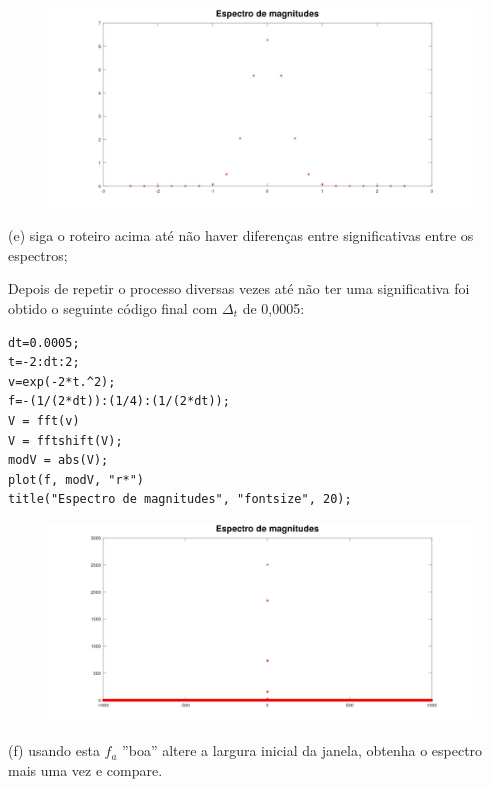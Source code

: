 \documentclass[10pt]{article}
\begin{document}
\begin{figure}[h]
    \includegraphics[scale=0.2]{questao1d2}
    \centering
\end{figure}

(e) siga o roteiro acima até não haver diferenças entre significativas entre os espectros;

\vspace{\baselineskip}
Depois de repetir o processo diversas vezes até não ter uma significativa foi obtido o seguinte código final com $\Delta_t$ de 0,0005:

\begin{verbatim}
dt=0.0005;
t=-2:dt:2;
v=exp(-2*t.^2);
f=-(1/(2*dt)):(1/4):(1/(2*dt));
V = fft(v)
V = fftshift(V);
modV = abs(V);
plot(f, modV, "r*")
title("Espectro de magnitudes", "fontsize", 20);    
\end{verbatim}

\begin{figure}[h]
    \includegraphics[scale=0.2]{questao1e}
    \centering
\end{figure}

(f) usando esta $f_a$ ''boa'' altere a largura inicial da janela, obtenha o espectro mais uma vez e compare.


\vspace{\baselineskip}
\end{document}
